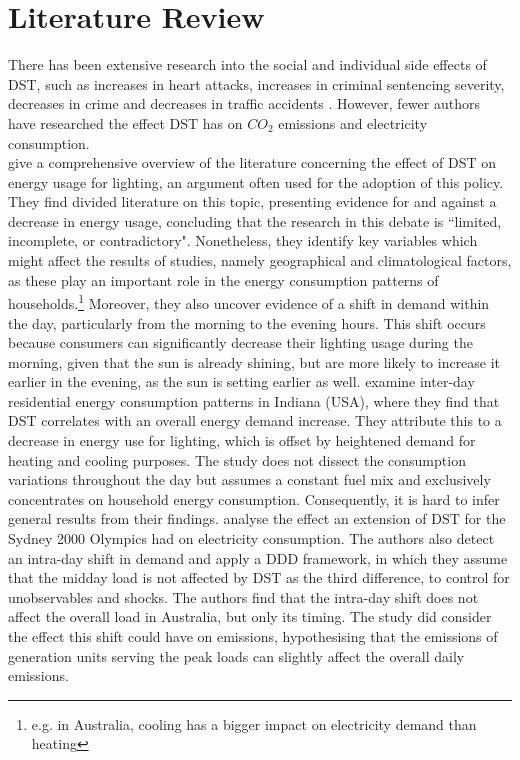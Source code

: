 \section{Literature Review}
There has been extensive research into the social and individual side effects of \ac{DST}, such as increases in heart attacks, increases in criminal sentencing severity, decreases in crime and decreases in traffic accidents \parencite{heart_attacks, sleepy_punishers, doleac_crime, bunnings_traffic}.
However, fewer authors have researched the effect \ac{DST} has on $CO_2$ emissions and electricity consumption. \\
\textcite{aries_effect_2008} give a comprehensive overview of the literature concerning the effect of \ac{DST} on energy usage for lighting, an argument often used for the adoption of this policy. They find divided literature on this topic, presenting evidence for and against a decrease in energy usage, concluding that the research in this debate is ``limited, incomplete, or contradictory". Nonetheless, they identify key variables which might affect the results of studies, namely geographical and climatological factors, as these play an important role in the energy consumption patterns of households.\footnote{e.g. in Australia, cooling has a bigger impact on electricity demand than heating} Moreover, they also uncover evidence of a shift in demand within the day, particularly from the morning to the evening hours. This shift occurs because consumers can significantly decrease their lighting usage during the morning, given that the sun is already shining, but are more likely to increase it earlier in the evening, as the sun is setting earlier as well.
\textcite{kotchen} examine inter-day residential energy consumption patterns in Indiana (USA), where they find that \ac{DST} correlates with an overall energy demand increase. They attribute this to a decrease in energy use for lighting, which is offset by heightened demand for heating and cooling purposes. The study does not dissect the consumption variations throughout the day but assumes a constant fuel mix and exclusively concentrates on household energy consumption. Consequently, it is hard to infer general results from their findings.
\textcite{kellogg_daylight_2008} analyse the effect  an extension of \ac{DST} for the Sydney 2000 Olympics had on electricity consumption. The authors also detect an intra-day shift in demand and apply a \ac{DDD} framework, in which they assume that the midday load is not affected by \ac{DST} as the third difference, to control for unobservables and shocks. The authors find that the intra-day shift does not affect the overall load in Australia, but only its timing. The study did consider the effect this shift could have on emissions, hypothesising that the emissions of generation units serving the peak loads can slightly affect the overall daily emissions.
